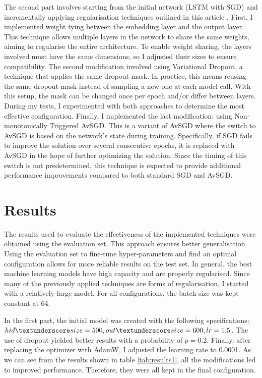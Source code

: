 \documentclass[a4paper]{article}
\begin{document}
The second part involves starting from the initial network (LSTM with SGD) and incrementally applying regularisation techniques outlined in this article \cite{merity2017regularizing}.
First, I implemented weight tying between the embedding layer and the output layer.
This technique allows multiple layers in the network to share the same weights, aiming to regularise the entire architecture.
To enable weight sharing, the layers involved must have the same dimensions, so I adjusted their sizes to ensure compatibility.
The second modification involved using Variational Dropout, a technique that applies the same dropout mask.
In practice, this means reusing the same dropout mask instead of sampling a new one at each model call.
With this setup, the mask can be changed once per epoch and/or differ between layers.
During my tests, I experimented with both approaches to determine the most effective configuration.
Finally, I implemented the last modification: using Non-monotonically Triggered AvSGD. This is a variant of AvSGD where the switch to AvSGD is based on the network’s state during training.
Specifically, if SGD fails to improve the solution over several consecutive epochs, it is replaced with AvSGD in the hope of further optimizing the solution.
Since the timing of this switch is not predetermined, this technique is expected to provide additional performance improvements compared to both standard SGD and AvSGD.

\section{Results}
The results used to evaluate the effectiveness of the implemented techniques were obtained using the evaluation set. This approach ensures better generalisation. Using the evaluation set to fine-tune hyper-parameters and find an optimal configuration allows for more reliable results on the test set.
In general, the best machine learning models have high capacity and are properly regularised. Since many of the previously applied techniques are forms of regularisation, I started with a relatively large model.
For all configurations, the batch size was kept constant at 64.


In the first part, the initial model was created with the following specifications: \(hid \textunderscore size=500, out \textunderscore size=600, lr=1.5\).
The use of dropout yielded better results with a probability of \(p=0.2\). Finally, after replacing the optimizer with AdamW, I adjusted the learning rate to 0.0001.
As we can see from the results shown in table \ref{tab:results1}, all the modifications led to improved performance. Therefore, they were all kept in the final configuration.
\end{document}
